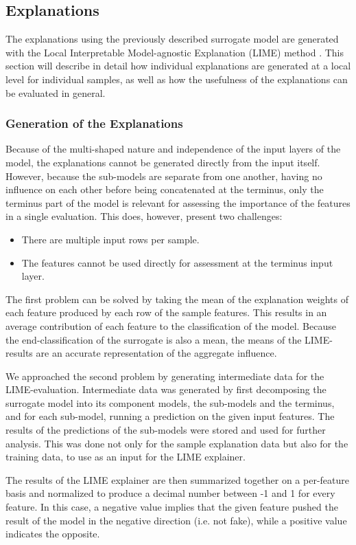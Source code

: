 \documentclass{article}
\begin{document}
		\subsection{Explanations}
		The explanations using the previously described surrogate model are generated with the
		Local Interpretable Model-agnostic Explanation (LIME) method \cite{ribeiro_why_2016}. This
		section will describe in detail how individual explanations are generated at a local level
		for individual samples, as well as how the usefulness of the explanations can be evaluated
		in general.
			\subsubsection{Generation of the Explanations}
			Because of the multi-shaped nature and independence of the input layers of the model,
			the explanations cannot be generated directly from the input itself. However, because
			the sub-models are separate from one another, having no influence on each other before
			being concatenated at the terminus, only the terminus part of the model is relevant
			for assessing the importance of the features in a single evaluation. This does,
			however, present two challenges:
			\begin{itemize}
				\item There are multiple input rows per sample.
				\item The features cannot be used directly for assessment at the terminus input
					layer.
			\end{itemize}
			The first problem can be solved by taking the mean of the explanation weights of each
			feature produced by each row of the sample features. This results in an average
			contribution of each feature to the classification of the model. Because the
			end-classification of the surrogate is also a mean, the means of the LIME-results are
			an accurate representation of the aggregate influence.
			\par
			We approached the second problem by generating intermediate data for the
			LIME-evaluation. Intermediate data was generated by first decomposing the surrogate
			model into its component models, the sub-models and the terminus, and for each
			sub-model, running a prediction on the given input features. The results of the
			predictions of the sub-models were stored and used for further analysis. This was done
			not only for the sample explanation data but also for the training data, to use as an
			input for the LIME explainer.
			\par
			The results of the LIME explainer are then summarized together on a per-feature basis
			and normalized to produce a decimal number between -1 and 1 for every feature. In this
			case, a negative value implies that the given feature pushed the result of the model
			in the negative direction (i.e. not fake), while a positive value indicates the
			opposite.
\end{document}
